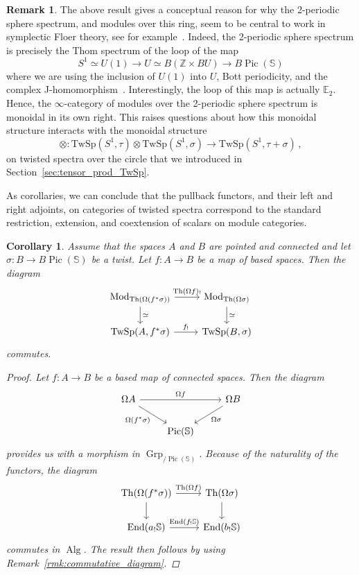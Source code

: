 \documentclass[10pt]{amsart}
\newcommand{\longto}{\longrightarrow}
\theoremstyle{plain}
\newtheorem{corollary}[theorem]{Corollary}
\theoremstyle{definition}
\newtheorem{rmk}[theorem]{Remark}
\DeclareMathOperator{\Mod}{Mod}
\DeclareMathOperator{\End}{End}
\DeclareMathOperator{\Grp}{Grp}
\DeclareMathOperator{\Th}{Th}
\DeclareMathOperator{\Pic}{Pic}
\DeclareMathOperator{\Alg}{Alg}
\newcommand{\bE}{\mathbb{E}}
\newcommand{\bS}{\mathbb{S}}
\newcommand{\bZ}{\mathbb{Z}}
\newcommand{\TwSp}{\mathrm{TwSp}}
\begin{document}
\begin{rmk}
  The above result gives a conceptual reason for why the 2-periodic sphere spectrum, and modules over this ring, seem to be central to work in symplectic Floer theory, see for example~\cite{AB21}.
  Indeed, the 2-periodic sphere spectrum is precisely the Thom spectrum of the loop of the map
  \[
  S^1 \simeq U(1) \longto U \simeq B(\bZ \times BU) \longto B\Pic(\bS)
  \]
  where we are using the inclusion of $U(1)$ into $U$, Bott periodicity, and the complex J-homomorphism~\cite{LurRotKthy}.
  Interestingly, the loop of this map is actually $\bE_2$.
  Hence, the $\infty$-category of modules over the 2-periodic sphere spectrum is monoidal in its own right.
  This raises questions about how this monoidal structure interacts with the monoidal structure
  \[
  \otimes : \TwSp(S^1,\tau) \otimes \TwSp(S^1, \sigma) \longto \TwSp(S^1 , \tau + \sigma) \,,
  \]
  on twisted spectra over the circle that we introduced in Section~\ref{sec:tensor_prod_TwSp}.
\end{rmk}

As corollaries, we can conclude that the pullback functors, and their left and right adjoints, on categories of twisted spectra correspond to the standard restriction, extension, and coextension of scalars on module categories.

\begin{corollary}
  Assume that the spaces $A$ and $B$ are pointed and connected and let $\sigma : B \to B\Pic(\bS)$ be a twist.
  Let $f : A \to B$ be a map of based spaces.
  Then the diagram
    \[
    \begin{tikzcd}
      \Mod_{\Th(\Omega(f^* \sigma))} \arrow[r,"\Th(\Omega f)_!"] \arrow[d,"\simeq"] & \Mod_{\Th(\Omega \sigma)} \arrow[d,"\simeq"] \\
      \TwSp(A, f^* \sigma) \arrow[r,"f_!"] & \TwSp(B,\sigma)
    \end{tikzcd}
    \]
    commutes.
    \begin{proof}
      Let $f : A \to B$ be a based map of connected spaces. Then the diagram
      \[
      \begin{tikzcd}
        \Omega A \arrow[rr,"\Omega f"] \arrow[dr,"\Omega(f^* \sigma)"'] & & \Omega B \arrow[dl,"\Omega \sigma"] \\
        & \Pic(\bS) &
      \end{tikzcd}
      \]
      provides us with a morphism in $\Grp_{/\Pic(\bS)}$. Because of the naturality of the functors, the diagram
      \[
      \begin{tikzcd}
        \Th(\Omega(f^* \sigma)) \arrow[d] \arrow[r,"\Th(\Omega f)"] & \Th(\Omega \sigma ) \arrow[d] \\
        \End(a_! \bS) \arrow[r,"\End(f_! \bS)"] & \End(b_! \bS)
      \end{tikzcd}
      \]
      commutes in $\Alg$. The result then follows by using Remark~\ref{rmk:commutative_diagram}.
    \end{proof}
\end{corollary}
\end{document}
